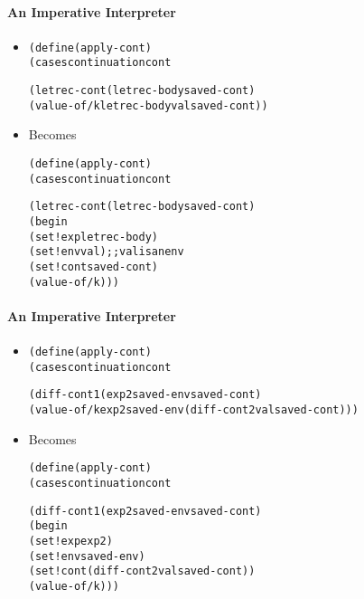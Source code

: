 \documentclass{beamer}
\begin{document}
\begin{frame}[fragile]
\framesubtitle{An Imperative Interpreter}
\begin{scriptsize}
\begin{itemize}
\item<1->
\begin{alltt}
(define (apply-cont)
  (cases continuation cont
    
    (letrec-cont (letrec-body saved-cont)
                 (value-of/k letrec-body val saved-cont))
\end{alltt}

\item<1-> Becomes
\begin{alltt}
(define (apply-cont)
  (cases continuation cont
    
    (letrec-cont (letrec-body saved-cont)
                 (begin
                   (set! exp letrec-body)
                   (set! env val) ;; val is an env
                   (set! cont saved-cont)
                   (value-of/k)))
\end{alltt}

\end{itemize}
\end{scriptsize}
\end{frame}

\begin{frame}[fragile]
\framesubtitle{An Imperative Interpreter}
\begin{scriptsize}
\begin{itemize}
\item<1->
\begin{alltt}
(define (apply-cont)
  (cases continuation cont

    (diff-cont1 (exp2 saved-env saved-cont)
      (value-of/k exp2 saved-env (diff-cont2 val saved-cont)))
\end{alltt}

\item<1-> Becomes
\begin{alltt}
(define (apply-cont)
  (cases continuation cont
    
    (diff-cont1 (exp2 saved-env saved-cont)
                (begin
                  (set! exp exp2)
                  (set! env saved-env)
                  (set! cont (diff-cont2 val saved-cont))
                  (value-of/k)))
\end{alltt}

\end{itemize}
\end{scriptsize}
\end{frame}
\end{document}
